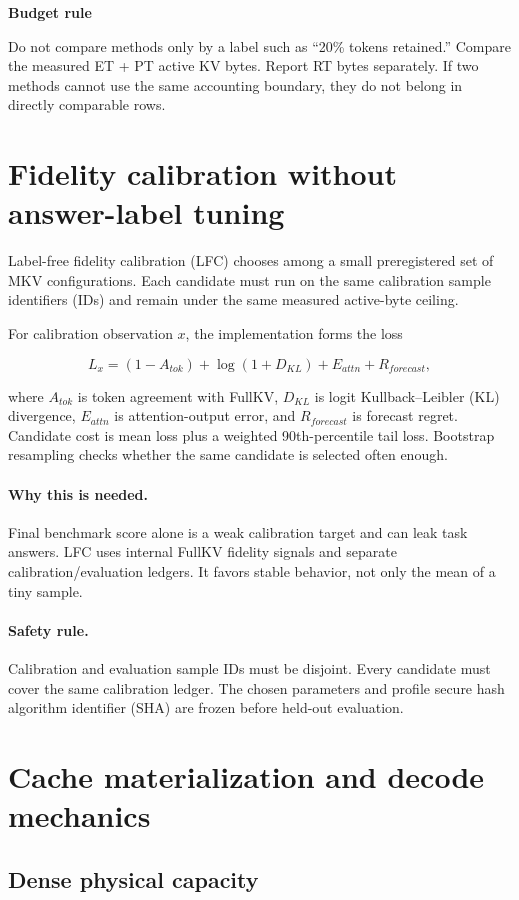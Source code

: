 \documentclass[11pt]{article}
\newcommand{\why}{\paragraph{Why this is needed.}}
\newcommand{\safety}{\paragraph{Safety rule.}}
\newenvironment{plainbox}[1]{%
  \begin{center}\begin{minipage}{0.94\linewidth}
  \colorbox{mklight}{\parbox{0.965\linewidth}{\textbf{#1}\par\smallskip}}
  \vspace{-0.5em}\small
}{%
  \end{minipage}\end{center}
}
\begin{document}
\begin{plainbox}{Budget rule}
Do not compare methods only by a label such as ``20\% tokens retained.'' Compare the measured ET
+ PT active KV bytes. Report RT bytes separately. If two methods cannot use the same accounting
boundary, they do not belong in directly comparable rows.
\end{plainbox}

\section{Fidelity calibration without answer-label tuning}
\label{sec:calibration}

Label-free fidelity calibration (LFC) chooses among a small preregistered set of MKV
configurations. Each candidate must run on the same calibration sample identifiers (IDs) and
remain under the same measured active-byte ceiling.

For calibration observation $x$, the implementation forms the loss

\begin{equation}
  L_x=(1-A_{tok})+\log(1+D_{KL})+E_{attn}+R_{forecast},
\end{equation}

where $A_{tok}$ is token agreement with FullKV, $D_{KL}$ is logit Kullback--Leibler (KL)
divergence, $E_{attn}$ is attention-output error, and $R_{forecast}$ is forecast regret. Candidate
cost is mean loss plus a weighted 90th-percentile tail loss. Bootstrap resampling checks whether
the same candidate is selected often enough.

\why Final benchmark score alone is a weak calibration target and can leak task answers. LFC uses
internal FullKV fidelity signals and separate calibration/evaluation ledgers. It favors stable
behavior, not only the mean of a tiny sample.

\safety Calibration and evaluation sample IDs must be disjoint. Every candidate must cover the
same calibration ledger. The chosen parameters and profile secure hash algorithm identifier (SHA)
are frozen before held-out evaluation.

\section{Cache materialization and decode mechanics}
\label{sec:materialization}

\subsection{Dense physical capacity}
\end{document}
